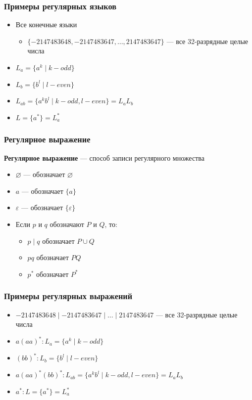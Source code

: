 \documentclass{beamer}
\begin{document}
\begin{frame}[fragile]
  \transwipe[direction=90]
  \frametitle{Примеры регулярных языков}
  \begin{itemize}
   \item Все конечные языки
    \begin{itemize}
     \item $\{-2 147 483 648, -2 147 483 647, \dots,  2 147 483 647\}$ --- все 32-разрядные целые числа
    \end{itemize}
    \item $L_a = \{a^k \mid k - odd \} $
    \item $L_b = \{b^l \mid l - even \} $
    \item $L_{ab} = \{a^k b^l \mid k - odd, l - even\} =  L_a L_b$
    \item $L = \{a^*\} = L_a^*$
  \end{itemize}


\end{frame}

\begin{frame}[fragile]
  \transwipe[direction=90]
  \frametitle{Регулярное выражение}
    \textbf{Регулярное выражение} --- способ записи регулярного множества


    \begin{itemize}
      \item $\varnothing $ --- обозначает $\varnothing$
      \item $a$  --- обозначает $\{a\}$
      \item $\varepsilon$  --- обозначает $\{\varepsilon\}$
      \item Если $p$ и $q$ обозначают $P$ и $Q$, то:
      \begin{itemize}
        \item $p \mid q$ обозначает $P \cup Q$
        \item $pq$ обозначает $PQ$
        \item $p^*$ обозначает $P^*$
      \end{itemize}
    \end{itemize}
\end{frame}

\begin{frame}[fragile]
  \transwipe[direction=90]
  \frametitle{Примеры регулярных выражений}
  \begin{itemize}
    \item $-2 147 483 648 \mid -2 147 483 647 \mid \dots \mid  2 147 483 647$ --- все 32-разрядные целые числа
    \item $a(aa)^*: L_a = \{a^k \mid k - odd \} $
    \item $(bb)^*: L_b = \{b^l \mid l - even \} $
    \item $a(aa)^* (bb)^* :  L_{ab} = \{a^k b^l \mid k - odd, l - even\} =  L_a L_b$
    \item $a^* : L = \{a^*\} = L_a^*$
  \end{itemize}
\end{frame}
\end{document}
